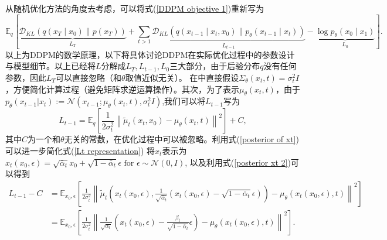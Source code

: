 从随机优化方法的角度去考虑，可以将式(\ref{DDPM objective 1})重新写为
\begin{equation}
\mathbb{E}_q[\underbrace{\mathcal{D}_{K L}\left(q\left(x_T \mid x_0\right) \| p\left(x_T\right)\right)}_{L_T}+\sum_{t>1} \underbrace{\mathcal{D}_{K L}\left(q\left(x_{t-1} \mid x_t, x_0\right) \| p_\theta\left(x_{t-1} \mid x_t\right)\right)}_{L_{t-1}}-\underbrace{\log p_\theta\left(x_0 \mid x_1\right)}_{L_0}].
    \end{equation}
以上为DDPM的数学原理，以下将具体讨论DDPM在实际优化过程中的参数设计与模型细节。以上已经将$L$分解成$L_T,L_{t-1},L_0$三大部分，由于后验分布$q$没有任何参数，因此$L_T$可以直接忽略（和$\theta$取值近似无关）。
在\cite{DDPM}中直接假设$\Sigma_{\theta}(x_t,t)=\sigma_t^2 I$，方便简化计算过程（避免矩阵求逆运算操作）。其次，为了表示$\mu_{\theta}(x_t,t)$，由于$p_{\theta}(x_{t-1}|x_t):= \mathcal{N}(x_{t-1};\mu_{\theta}(x_t,t),\sigma_t^2I)$,我们可以将$L_{t-1}$写为
\begin{equation}
    L_{t-1}=\mathbb{E}_q\left[\frac{1}{2 \sigma_t^2}\left\|\tilde{{\mu}}_t\left({x}_t, {x}_0\right)-{\mu}_\theta\left({x}_t, t\right)\right\|^2\right]+C,
    \label{Lt representation}
\end{equation}
其中$C$为一个和$\theta$无关的常数，在优化过程中可以被忽略。利用式(\ref{posterior of xt})可以进一步简化式(\ref{Lt representation}) 将$x_t$表示为${x}_t\left({x}_0, {\epsilon}\right)=\sqrt{\bar{\alpha}_t} {x}_0+\sqrt{1-\bar{\alpha}_t} {\epsilon} \text { for } {\epsilon} \sim \mathcal{N}({0}, {I}) $, 以及利用式(\ref{posterior xt 2})可以得到
\begin{align}
    L_{t-1}-C&=\mathbb{E}_{{x}_0, {\epsilon}}\left[\frac{1}{2 \sigma_t^2}\left\|\tilde{{\mu}}_t\left({x}_t\left({x}_0, {\epsilon}\right), \frac{1}{\sqrt{\bar{\alpha}_t}}\left({x}_t\left({x}_0, {\epsilon}\right)-\sqrt{1-\bar{\alpha}_t} {\epsilon}\right)\right)-{\mu}_\theta\left({x}_t\left({x}_0, {\epsilon}\right), t\right)\right\|^2\right]\\
&=\mathbb{E}_{{x}_0, {\epsilon}}\left[\frac{1}{2 \sigma_t^2}\left\|\frac{1}{\sqrt{\alpha_t}}\left({x}_t\left({x}_0, {\epsilon}\right)-\frac{\beta_t}{\sqrt{1-\bar{\alpha}_t}} {\epsilon}\right)-{\mu}_\theta\left({x}_t\left({x}_0, {\epsilon}\right), t\right)\right\|^2\right].
\end{align}
